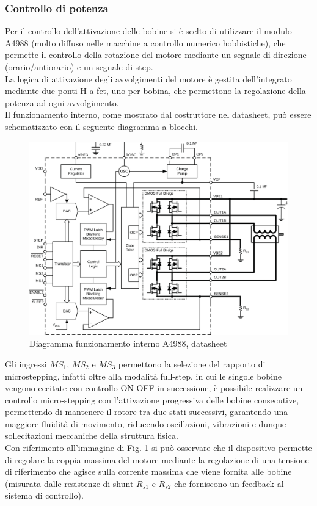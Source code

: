 \documentclass[12pt]{article}
\begin{document}
        \subsubsection{Controllo di potenza}
        Per il controllo dell'attivazione delle bobine si è scelto di utilizzare il modulo A4988 (molto diffuso nelle macchine a controllo numerico hobbistiche), che permette il controllo della rotazione del motore mediante un segnale di direzione (orario/antiorario) e un segnale di step.\\
        La logica di attivazione degli avvolgimenti del motore è gestita dell'integrato mediante due ponti H a fet, uno per bobina, che permettono la regolazione della potenza ad ogni avvolgimento.\\
        Il funzionamento interno, come mostrato dal costruttore nel datasheet, può essere schematizzato con il seguente diagramma a blocchi.\\
        \begin{figure}[h]
        \centering
            \includegraphics[width=320pt]{Draws/A4988_functional_diagram.png}
            \caption{Diagramma funzionamento interno A4988, datasheet}
            \label{fig:A4988_diagram}
        \end{figure}
        
        \noindent
        Gli ingressi $MS_1$, $MS_2$ e $MS_3$ permettono la selezione del rapporto di microstepping, infatti oltre alla modalità full-step, in cui le singole bobine vengono eccitate con controllo ON-OFF in successione, è possibile realizzare un controllo micro-stepping con l'attivazione progressiva delle bobine consecutive, permettendo di mantenere il rotore tra due stati successivi, garantendo una maggiore fluidità di movimento, riducendo oscillazioni, vibrazioni e dunque sollecitazioni meccaniche della struttura fisica.\\
        Con riferimento all'immagine di Fig. \ref{fig:A4988_diagram} si può osservare che il dispositivo permette di regolare la coppia massima del motore mediante la regolazione di una tensione di riferimento che agisce sulla corrente massima che viene fornita alle bobine (misurata dalle resistenze di shunt $R_{s1}$ e $R_{s2}$ che forniscono un feedback al sistema di controllo).
\end{document}

